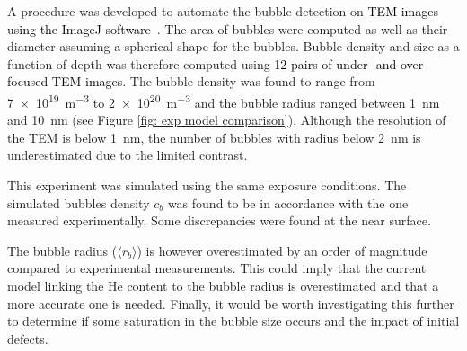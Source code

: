 A procedure was developed to automate the bubble detection on \textcolor{black}{TEM images using the ImageJ software~}.
The area of bubbles were computed as well as their diameter assuming a spherical shape for the bubbles.
Bubble density and size as a function of depth was therefore computed using \textcolor{black}{12 pairs of under- and over-focused TEM images}.
The bubble density was found to range from \SI{7e19}{m^{-3}} to \SI{2e20}{m^{-3}} and the bubble radius ranged between \SI{1}{nm} and \SI{10}{nm} (see Figure \ref{fig: exp model comparison}).
Although the resolution of the TEM is below \SI{1}{nm}, the number of bubbles with radius below \SI{2}{nm} is underestimated due to the limited contrast.

This experiment was simulated using the same exposure conditions.
The simulated bubbles density $c_b$ was found to be in accordance with the one measured experimentally.
Some discrepancies were found at the near surface.

The bubble radius ($\langle r_b \rangle$) is however overestimated by an order of magnitude compared to experimental measurements.
This could imply that the current model linking the He content to the bubble radius is overestimated and that a more accurate one is needed.
Finally, it would be worth investigating this further to determine if some saturation in the bubble size occurs and the impact of initial defects.


